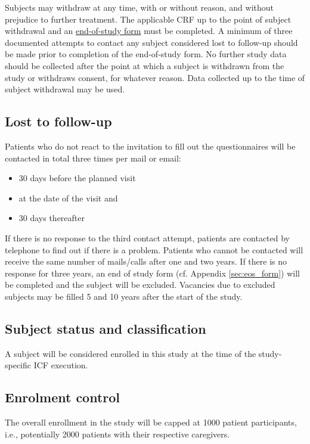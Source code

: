 Subjects may withdraw at any time, with or without reason, and without prejudice to further treatment. The applicable \ac{CRF} up to the point of subject withdrawal and an \hyperref[sec:eos_form]{end-of-study form} must be completed. A minimum of three documented attempts to contact any subject considered lost to follow-up should be made prior to completion of the end-of-study form. No further study data should be collected after the point at which a subject is withdrawn from the study or withdraws consent, for whatever reason. Data collected up to the time of subject withdrawal may be used.

\subsection{Lost to follow-up}
Patients who do not react to the invitation to fill out the questionnaires will be contacted in total three times per mail or email:
\begin{itemize}
\item 30 days before the planned visit
\item at the date of the visit and
\item 30 days thereafter
\end{itemize}
If there is no response to the third contact attempt, patients are contacted by telephone to find out if there is a problem. Patients who cannot be contacted will receive the same number of mails/calls after one and two years. If there is no response for three years, an end of study form (cf. Appendix \ref{sec:eos_form}) will be completed and the subject will be excluded. Vacancies due to excluded subjects may be filled 5 and 10 years after the start of the study.

\subsection{Subject status and classification}
A subject will be considered enrolled in this study at the time of the study-specific \ac{ICF} execution.

\subsection{Enrolment control}
The overall enrollment in the study will be capped at \num[round-precision = 0, round-mode = places]{1000} patient participants, i.e., potentially \num[round-precision = 0, round-mode = places]{2000} patients with their respective caregivers.


